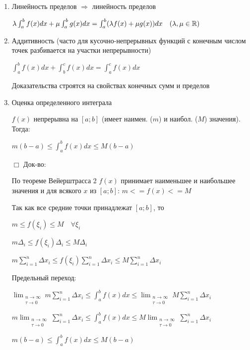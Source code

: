 \documentclass[12pt]{article}
\begin{document}
    \begin{enumerate}
        \item Линейность пределов $\Longrightarrow$ линейность пределов

        $\lambda \int^b_a f(x)dx + \mu \int^b_a g(x)dx = \int^b_a (\lambda f(x) + \mu g(x)) dx \quad (\lambda, \mu \in \mathbb{R})$

        \item Аддитивность (часто для кусочно-непрерывных функций с конечным числом точек разбивается на участки непрерывности)

        $\int^b_a f(x)dx + \int^c_b f(x)dx = \int^c_a f(x)dx$

        Доказательства строятся на свойствах конечных сумм и пределов

        \item \hypertarget{integralevaluation}{Оценка определенного интеграла}

        $f(x)$ непрерывна на $[a; b]$ (имеет наимен. ($m$) и наибол. ($M$) значения). Тогда:

        $m (b-a) \leq \int^b_a f(x)dx \leq M(b - a)$

        $\Box$ Док-во:

        По теореме Вейерштрасса 2 $f(x)$ принимает наименьшее и наибольшее значения и для всякого $x$ из $[a; b]$:  $m <= f(x) <= M$

        Так как все средние точки принадлежат $[a; b]$, то

        $m \leq f(\xi_i) \leq M \quad \forall \xi_i$

        $m \Delta_i \leq f(\xi_i) \Delta_i \leq M \Delta_i$

        $m \sum_{i=1}^n \Delta x_i \leq f(\xi_i) \sum_{i=1}^n \Delta x_i \leq M \sum_{i=1}^n \Delta x_i$

        Предельный переход:

        $\lim_{\substack{n\to\infty \\ \tau\to0}} m \sum_{i=1}^n \Delta x_i \leq \int^b_a f(x) dx \leq \lim_{\substack{n\to\infty \\ \tau\to0}} M \sum_{i=1}^n \Delta x_i$

        $m \lim_{\substack{n\to\infty \\ \tau\to0}} \sum_{i=1}^n \Delta x_i \leq \int^b_a f(x) dx \leq M \lim_{\substack{n\to\infty \\ \tau\to0}} \sum_{i=1}^n \Delta x_i$

        $m (b - a) \leq \int^b_a f(x) dx \leq M (b - a)$


\end{enumerate}
\end{document}
